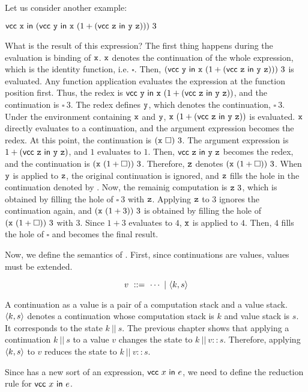 Let us consider another example:

$
\textsf{vcc}\ \texttt{x}\ \textsf{in}\ (\textsf{vcc}\ \texttt{y}\ \textsf{in}\ \texttt{x}\ (1+(\textsf{vcc}\ \texttt{z}\ \textsf{in}\ \texttt{y}\ \texttt{z})))\ 3
$

What is the result of this expression?
The first thing happens during the evaluation is binding of $\texttt{x}$. $\texttt{x}$ denotes the
continuation of the whole expression, which is the identity function, i.e.
$\square$. Then,
$(\textsf{vcc}\ \texttt{y}\ \textsf{in}\ \texttt{x}\ (1+(\textsf{vcc}\ \texttt{z}\ \textsf{in}\ \texttt{y}\ \texttt{z})))\ 3$ is
evaluated. Any function application evaluates the expression at the function
position first. Thus, the redex is
$\textsf{vcc}\ \texttt{y}\ \textsf{in}\ \texttt{x}\ (1+(\textsf{vcc}\ \texttt{z}\ \textsf{in}\ \texttt{y}\ \texttt{z}))$, and the
continuation is $\square\ 3$. The redex defines $\texttt{y}$, which denotes the
continuation, $\square\ 3$. Under the environment containing $\texttt{x}$ and $\texttt{y}$,
$\texttt{x}\ (1+(\textsf{vcc}\ \texttt{z}\ \textsf{in}\ \texttt{y}\ \texttt{z}))$ is evaluated. $\texttt{x}$ directly
evaluates to a continuation, and the argument expression becomes the redex.
At this point, the continuation is $(\cx\ \square)\ 3$. The argument
expression is $1+(\textsf{vcc}\ \texttt{z}\ \textsf{in}\ \texttt{y}\ \texttt{z})$, and $1$ evaluates to $1$.
Then, $\textsf{vcc}\ \texttt{z}\ \textsf{in}\ \texttt{y}\ \texttt{z}$ becomes the redex, and the continuation is
$(\texttt{x}\ (1+\square))\ 3$. Therefore, $\texttt{z}$ denotes $(\texttt{x}\ (1+\square))\ 3$.
When $\texttt{y}$ is applied to $\texttt{z}$, the original continuation is ignored, and $\texttt{z}$ fills
the hole in the continuation denoted by \cy. Now, the remainig computation
is $\texttt{z}\ 3$, which is obtained by filling the hole of $\square\ 3$ with $\texttt{z}$.
Applying $\texttt{z}$ to $3$ ignores the continuation again, and $(\cx\ (1+3))\
3$ is obtained by filling the hole of $(\texttt{x}\ (1+\square))\ 3$ with $3$.
Since $1+3$ evaluates to $4$, $\texttt{x}$ is applied to $4$. Then, $4$ fills the hole of
$\square$ and becomes the final result.

Now, we define the semantics of \lang. First, since continuations are values,
values must be extended.

\[
  v\ ::=\ \cdots\ |\ \contv{k}{s}
\]

A continuation as a value is a pair of a computation
stack and a value stack. $\langle k,s\rangle$ denotes a continuation whose computation
stack is $k$ and value stack is $s$. It corresponds to the state $k\ ||\ s$.
The previous chapter shows that applying a continuation $k\ ||\ s$ to a value
$v$ changes the state to $k\ ||\ v::s$. Therefore, applying $\langle k,s\rangle$
to $v$ reduces the state to $k\ ||\ v::s$.

Since \lang has a new sort of an expression, $\textsf{vcc}\ x\ \textsf{in}\ e$, we need to define
the reduction rule for $\textsf{vcc}\ x\ \textsf{in}\ e$.

